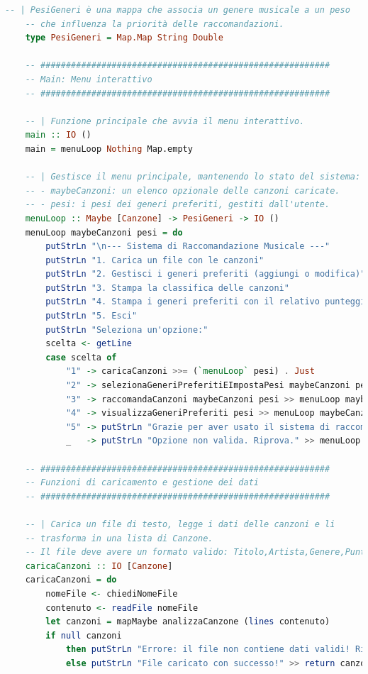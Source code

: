 \documentclass[a4paper,11pt]{article}
\begin{document}
\begin{lstlisting}[language=Haskell]
    -- | PesiGeneri è una mappa che associa un genere musicale a un peso
    -- che influenza la priorità delle raccomandazioni.
    type PesiGeneri = Map.Map String Double
    
    -- #########################################################
    -- Main: Menu interattivo
    -- #########################################################
    
    -- | Funzione principale che avvia il menu interattivo.
    main :: IO ()
    main = menuLoop Nothing Map.empty
    
    -- | Gestisce il menu principale, mantenendo lo stato del sistema:
    -- - maybeCanzoni: un elenco opzionale delle canzoni caricate.
    -- - pesi: i pesi dei generi preferiti, gestiti dall'utente.
    menuLoop :: Maybe [Canzone] -> PesiGeneri -> IO ()
    menuLoop maybeCanzoni pesi = do
        putStrLn "\n--- Sistema di Raccomandazione Musicale ---"
        putStrLn "1. Carica un file con le canzoni"
        putStrLn "2. Gestisci i generi preferiti (aggiungi o modifica)"
        putStrLn "3. Stampa la classifica delle canzoni"
        putStrLn "4. Stampa i generi preferiti con il relativo punteggio"
        putStrLn "5. Esci"
        putStrLn "Seleziona un'opzione:"
        scelta <- getLine
        case scelta of
            "1" -> caricaCanzoni >>= (`menuLoop` pesi) . Just
            "2" -> selezionaGeneriPreferitiEImpostaPesi maybeCanzoni pesi >>= menuLoop maybeCanzoni
            "3" -> raccomandaCanzoni maybeCanzoni pesi >> menuLoop maybeCanzoni pesi
            "4" -> visualizzaGeneriPreferiti pesi >> menuLoop maybeCanzoni pesi
            "5" -> putStrLn "Grazie per aver usato il sistema di raccomandazione. Arrivederci!"
            _   -> putStrLn "Opzione non valida. Riprova." >> menuLoop maybeCanzoni pesi
    
    -- #########################################################
    -- Funzioni di caricamento e gestione dei dati
    -- #########################################################
    
    -- | Carica un file di testo, legge i dati delle canzoni e li
    -- trasforma in una lista di Canzone.
    -- Il file deve avere un formato valido: Titolo,Artista,Genere,Punteggio.
    caricaCanzoni :: IO [Canzone]
    caricaCanzoni = do
        nomeFile <- chiediNomeFile
        contenuto <- readFile nomeFile
        let canzoni = mapMaybe analizzaCanzone (lines contenuto)
        if null canzoni
            then putStrLn "Errore: il file non contiene dati validi! Riprova." >> caricaCanzoni
            else putStrLn "File caricato con successo!" >> return canzoni
    

\end{lstlisting}
\end{document}
